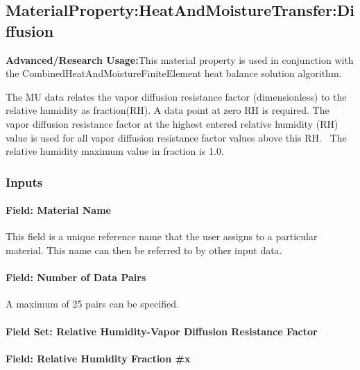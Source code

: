 \subsection{MaterialProperty:HeatAndMoistureTransfer:Diffusion}\label{materialpropertyheatandmoisturetransferdiffusion}

\textbf{Advanced/Research Usage:}This material property is used in conjunction with the CombinedHeatAndMoistureFiniteElement heat balance solution algorithm.

The MU data relates the vapor diffusion resistance factor (dimensionless) to the relative humidity as fraction(RH). A data point at zero RH is required. The vapor diffusion resistance factor at the highest entered relative humidity (RH) value is used for all vapor diffusion resistance factor values above this RH.~ The relative humidity maximum value in fraction is 1.0.

\subsubsection{Inputs}\label{inputs-11-019}

\paragraph{Field: Material Name}\label{field-material-name-4}

This field is a unique reference name that the user assigns to a particular material. This name can then be referred to by other input data.

\paragraph{Field: Number of Data Pairs}\label{field-number-of-data-pairs}

A maximum of 25 pairs can be specified.

\paragraph{Field Set: Relative Humidity-Vapor Diffusion Resistance Factor}\label{field-set-relative-humidity-vapor-diffusion-resistance-factor}

\paragraph{Field: Relative Humidity Fraction \#x}\label{field-relative-humidity-fraction-x-1}

